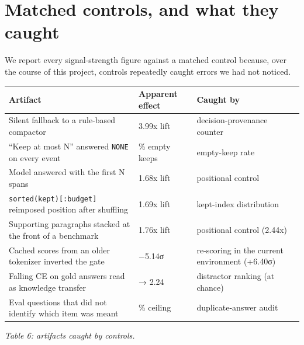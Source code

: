 \documentclass[10pt]{article}
\begin{document}
\section{Matched controls, and what they caught}

We report every signal-strength figure against a matched control because, over the course of
this project, controls repeatedly caught errors we had not noticed.

\begin{longtable}[]{@{}
  >{\raggedright\arraybackslash}p{}
  >{\raggedright\arraybackslash}p{}
  >{\raggedright\arraybackslash}p{}@{}}
\toprule\noalign{}
\begin{minipage}[b]{\linewidth}\raggedright
Artifact
\end{minipage} & \begin{minipage}[b]{\linewidth}\raggedright
Apparent effect
\end{minipage} & \begin{minipage}[b]{\linewidth}\raggedright
Caught by
\end{minipage} \\
\midrule\noalign{}
\endhead
\bottomrule\noalign{}
\endlastfoot
Silent fallback to a rule-based compactor & 3.99x lift & decision-provenance counter \\
``Keep at most N'' answered \texttt{NONE} on every event & 100\% empty keeps & empty-keep rate \\
Model answered with the first N spans & 1.68x lift & positional control \\
\texttt{sorted(kept){[}:budget{]}} reimposed position after shuffling & 1.69x lift & kept-index distribution \\
Supporting paragraphs stacked at the front of a benchmark & 1.76x lift & positional control (2.44x) \\
Cached scores from an older tokenizer inverted the gate & −5.14σ & re-scoring in the current environment (+6.40σ) \\
Falling CE on gold answers read as knowledge transfer & 6.29 → 2.24 & distractor ranking (at chance) \\
Eval questions that did not identify which item was meant & 50\% ceiling & duplicate-answer audit \\
\end{longtable}

\emph{Table 6: artifacts caught by controls.}
\end{document}
